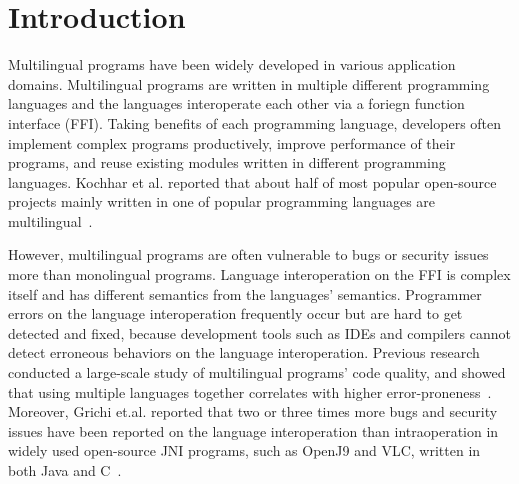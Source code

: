 \section{Introduction}
Multilingual programs have been widely developed in various application
domains. Multilingual programs are written in multiple different programming
languages and the languages interoperate each other via a foriegn function
interface (FFI).  Taking benefits of each programming language, developers
often implement complex programs productively, improve performance of their
programs, and reuse existing modules written in different programming
languages. Kochhar et al. reported that about half of most popular open-source
projects mainly written in one of popular programming languages are
multilingual~\cite{kochhar2016large}.



However, multilingual programs are often vulnerable to bugs or security issues
more than monolingual programs.  Language interoperation on the FFI is complex
itself and has different semantics from the languages' semantics.  Programmer
errors on the language interoperation frequently occur but are hard to get
detected and fixed, because development tools such as IDEs and compilers cannot
detect erroneous behaviors on the language interoperation.  Previous research
conducted a large-scale study of multilingual programs' code quality, and
showed that using multiple languages together correlates with higher
error-proneness~\cite{kochhar2016large}.  Moreover, Grichi et.al.  reported
that two or three times more bugs and security issues have been reported on the
language interoperation than intraoperation in widely used open-source JNI
programs, such as OpenJ9 and VLC, written in both Java and
C~\cite{grichi2020impact}.


